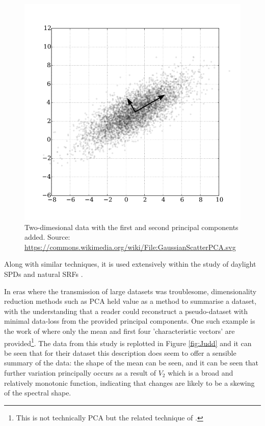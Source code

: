 \begin{figure}[htbp]
 \includegraphics[max width=\textwidth]{figs/LitRev/PCA.png}
 \caption{Two-dimesional data with the first and second principal components added. Source: \url{https://commons.wikimedia.org/wiki/File:GaussianScatterPCA.svg}}
 \label{fig:PCA}
\end{figure} 

Along with similar techniques, it is used extensively within the study of daylight \glspl{SPD} \citep{hernandez-andres_color_2001,ojeda_influence_2012,pant_estimating_2009,bui_group_2004,judd_spectral_1964,maloney_computational_1984,spitschan_variation_2016} and natural \glspl{SRF} \citep{maloney_computational_1984,dzmura_color_1992,maloney_evaluation_1986,maloney_color_1986,cohen_dependency_1964,ferrero_principal_2011,zhang_reconstructing_2008,kwon_surface_2007,agahian_reconstruction_2008,harifi_recovery_2008,parkkinen_characteristic_1989,vrhel_color_1992,fairman_principal_2004,ayala_use_2006,eem_reconstruction_1994-2,connah_multispectral_2006,shi_using_2002,morovic_metamer-set-based_2006}. 

In eras where the transmission of large datasets was troublesome, dimensionality reduction methods such as \gls{PCA} held value as a method to summarise a dataset, with the understanding that a reader could reconstruct a pseudo-dataset with minimal data-loss from the provided principal components. One such example is the work of \citet{judd_spectral_1964} where only the mean and first four 'characteristic vectors' are provided\footnote{This is not technically \gls{PCA} but the related technique of \citet{morris_objective_1954}.}. The data from this study is replotted in Figure \ref{fig:Judd} and it can be seen that for their dataset this description does seem to offer a sensible summary of the data: the shape of the mean can be seen, and it can be seen that further variation principally occurs as a result of $V_{2}$ which is a broad and relatively monotonic function, indicating that changes are likely to be a skewing of the spectral shape.

